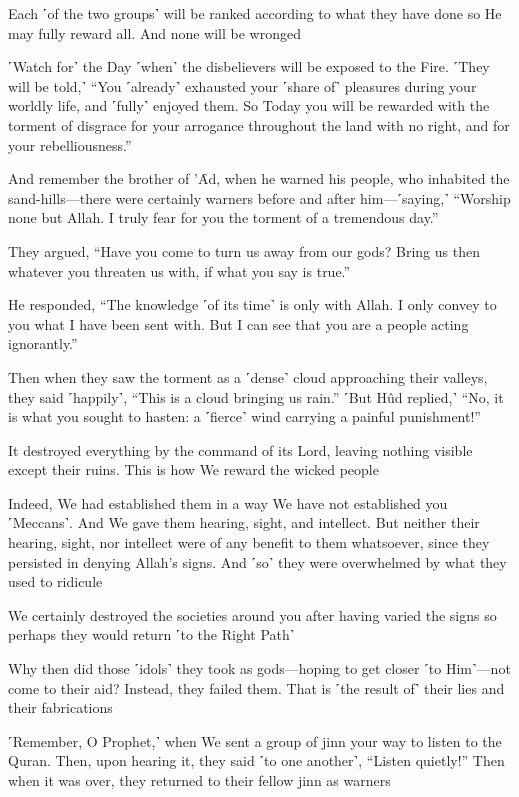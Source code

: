 Each ˹of the two groups˺ will be ranked according to what they have done so He may fully reward all. And none will be wronged

˹Watch for˺ the Day ˹when˺ the disbelievers will be exposed to the Fire. ˹They will be told,˺ “You ˹already˺ exhausted your ˹share of˺ pleasures during your worldly life, and ˹fully˺ enjoyed them. So Today you will be rewarded with the torment of disgrace for your arrogance throughout the land with no right, and for your rebelliousness.”

And remember the brother of ’Ȃd, when he warned his people, who inhabited the sand-hills—there were certainly warners before and after him—˹saying,˺ “Worship none but Allah. I truly fear for you the torment of a tremendous day.”

They argued, “Have you come to turn us away from our gods? Bring us then whatever you threaten us with, if what you say is true.”

He responded, “The knowledge ˹of its time˺ is only with Allah. I only convey to you what I have been sent with. But I can see that you are a people acting ignorantly.”

Then when they saw the torment as a ˹dense˺ cloud approaching their valleys, they said ˹happily˺, “This is a cloud bringing us rain.” ˹But Hûd replied,˺ “No, it is what you sought to hasten: a ˹fierce˺ wind carrying a painful punishment!”

It destroyed everything by the command of its Lord, leaving nothing visible except their ruins. This is how We reward the wicked people

Indeed, We had established them in a way We have not established you ˹Meccans˺. And We gave them hearing, sight, and intellect. But neither their hearing, sight, nor intellect were of any benefit to them whatsoever, since they persisted in denying Allah’s signs. And ˹so˺ they were overwhelmed by what they used to ridicule

We certainly destroyed the societies around you after having varied the signs so perhaps they would return ˹to the Right Path˺

Why then did those ˹idols˺ they took as gods—hoping to get closer ˹to Him˺—not come to their aid? Instead, they failed them. That is ˹the result of˺ their lies and their fabrications

˹Remember, O Prophet,˺ when We sent a group of jinn your way to listen to the Quran. Then, upon hearing it, they said ˹to one another˺, “Listen quietly!” Then when it was over, they returned to their fellow jinn as warners

